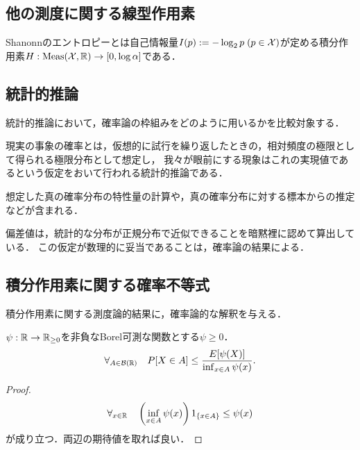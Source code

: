 \documentclass[uplatex,dvipdfmx]{jsreport}
\begin{document}
\subsection{他の測度に関する線型作用素}

\begin{definition}[entropy]
    Shanonnのエントロピーとは自己情報量$I(p):=-\log_2p\;(p\in\mathcal{X})$が定める積分作用素$H:\mathrm{Meas}(\mathcal{X},\mathbb{R})\to[0,\log\alpha]$である．
\end{definition}

\subsection{統計的推論}

\begin{tcolorbox}[colframe=ForestGreen, colback=ForestGreen!10!white,breakable,colbacktitle=ForestGreen!40!white,coltitle=black,fonttitle=\bfseries\sffamily,
title=]
    統計的推論において，確率論の枠組みをどのように用いるかを比較対象する．
\end{tcolorbox}

\begin{definition}
    現実の事象の確率とは，仮想的に試行を繰り返したときの，相対頻度の極限として得られる極限分布として想定し，
    我々が眼前にする現象はこれの実現値であるという仮定をおいて行われる統計的推論である．

    想定した真の確率分布の特性量の計算や，真の確率分布に対する標本からの推定などが含まれる．
\end{definition}
\begin{example}[頻度主義的推論]
    偏差値は，統計的な分布が正規分布で近似できることを暗黙裡に認めて算出している．
    この仮定が数理的に妥当であることは，確率論の結果による．
\end{example}

\subsection{積分作用素に関する確率不等式}

\begin{tcolorbox}[colframe=ForestGreen, colback=ForestGreen!10!white,breakable,colbacktitle=ForestGreen!40!white,coltitle=black,fonttitle=\bfseries\sffamily,
title=]
    積分作用素に関する測度論的結果に，確率論的な解釈を与える．
\end{tcolorbox}

\begin{theorem}[Chebyshevの不等式]\label{thm-Chebyshev-inequality}\mbox{}
    $\psi:\mathbb{R}\to\mathbb{R}_{\ge0}$を非負なBorel可測な関数とする$\psi\ge0$．
    \[\forall_{A\in\mathcal{B}(\mathbb{R})}\quad P[X\in A]\le\frac{E[\psi(X)]}{\inf_{x\in A}\psi(x)}.\]
\end{theorem}
\begin{proof}
    \[\forall_{x\in\mathbb{R}}\quad\left(\inf_{x\in A}\psi(x)\right)1_{\left\{x\in A\right\}}\le\psi(x)\]
    が成り立つ．両辺の期待値を取れば良い．
\end{proof}
\end{document}
